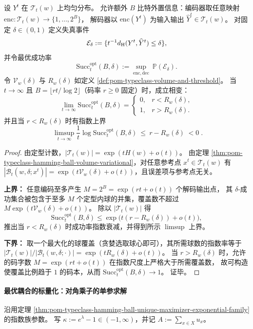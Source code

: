 \begin{theorem}\label{thm:pom-microcanonical-partial-inversion-threshold}
设 \(Y^t\) 在 \(\mathcal T_t(w)\) 上均匀分布。
允许额外 \(B\) 比特外置信息：编码器取任意映射 \(\mathrm{enc}:\mathcal T_t(w)\to\{1,\dots,2^B\}\)，
解码器以 \(\mathrm{enc}(Y^t)\) 为输入输出 \(\widehat Y^t\in\mathcal T_t(w)\)。
对固定 \(\delta\in(0,1)\) 定义失真事件
\[
\mathcal E_\delta:=\{t^{-1}d_{\rm H}(Y^t,\widehat Y^t)\le \delta\},
\]
并令最优成功率
\[
\mathrm{Succ}^{\mathrm{opt}}_t(B,\delta):=\sup_{\mathrm{enc},\mathrm{dec}}\ \mathbb P(\mathcal E_\delta).
\]
令 \(\mathcal V_w(\delta)\) 与 \(R_w(\delta)\) 如定义 \ref{def:pom-typeclass-volume-and-threshold}。
当 \(t\to\infty\) 且 \(B=\lfloor rt/\log 2\rfloor\)（码率 \(r\ge 0\) 固定）时，成立相变：
\[
\boxed{\;
\lim_{t\to\infty}\mathrm{Succ}^{\mathrm{opt}}_t(B,\delta)=
\begin{cases}
0, & r<R_w(\delta),\\
1, & r>R_w(\delta).
\end{cases}\;}
\]
并且当 \(r<R_w(\delta)\) 时有指数上界
\[
\boxed{\;
\limsup_{t\to\infty}\frac{1}{t}\log \mathrm{Succ}^{\mathrm{opt}}_t(B,\delta)\ \le\ r-R_w(\delta)\;<0\; }.
\]
\end{theorem}
\begin{proof}
由定型计数，\(|\mathcal T_t(w)|=\exp(tH(w)+o(t))\)。
由定理 \ref{thm:pom-typeclass-hamming-ball-volume-variational}，对任意参考点 \(x^t\in\mathcal T_t(w)\) 有
\(|\mathcal B_t(w,\delta;x^t)|=\exp(t\mathcal V_w(\delta)+o(t))\)，且误差项与参考点无关。
\par
\textbf{上界：}
任意编码至多产生 \(M=2^B=\exp(rt+o(t))\) 个解码输出点，
其 \(\delta\)-成功集合被包含于至多 \(M\) 个定型内球的并集，覆盖数不超过
\(
M\exp(t\mathcal V_w(\delta)+o(t))
\)。
除以 \(|\mathcal T_t(w)|\) 得
\[
\mathrm{Succ}^{\mathrm{opt}}_t(B,\delta)
\le
\exp\!\bigl(t(r-\!R_w(\delta))+o(t)\bigr),
\]
推出当 \(r<R_w(\delta)\) 时成功率指数衰减，并得到所示 \(\limsup\) 上界。
\par
\textbf{下界：}
取一个最大化的球覆盖（贪婪选取球心即可），其所需球数的指数率等于
\(|\mathcal T_t(w)|/|\mathcal B_t(w,\delta;\cdot)|=\exp(tR_w(\delta)+o(t))\)。
当 \(r>R_w(\delta)\) 时，允许的码字数 \(M=\exp(rt+o(t))\) 在指数尺度上严格大于所需覆盖数，
故可构造使覆盖比例趋于 \(1\) 的码本，从而 \(\mathrm{Succ}^{\mathrm{opt}}_t(B,\delta)\to 1\)。
证毕。
\end{proof}

\paragraph{最优耦合的标量化：对角乘子的单参求解}
沿用定理 \ref{thm:pom-typeclass-hamming-ball-unique-maximizer-exponential-family} 的指数族参数。
写 \(\kappa:=e^{\lambda}-1\in(-1,\infty)\)，并记 \(A:=\sum_{x\in X}u_x\)。

